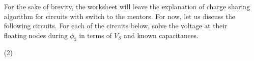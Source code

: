 For the sake of brevity, the worksheet will leave the explanation of charge sharing algorithm for circuits with switch to the mentors. For now, let us discuss the following circuits. For each of the circuits below, solve the voltage at their floating nodes during $\phi_2$ in terms of $V_S$ and known capacitances.

\begin{tasks}(2)
    \task{
        \begin{center}
            
        \end{center}
    }
    \task{\textbf{[PRACTICE]}\\
        \begin{center}
            
        \end{center}
    }
\end{tasks}

